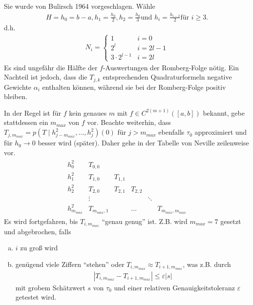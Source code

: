 \documentclass[ngerman,fontsize=11pt, paper=a4, parskip=half, titlepage=true, toc=bib]{scrbook}
\begin{document}
Sie wurde von Bulirsch 1964 vorgeschlagen.
Wähle 
\begin{gather}
  H=h_0=b-a, h_1=\frac{h_0}{2},h_2=\frac{h_0}{3}
  \text{und }  h_i=\frac{h_{i-2}}{2} \text{für } i\geq 3.
  \label{VII.3.9}
\end{gather}
d.h. 
\begin{gather*}
  N_i = \begin{cases}1&i=0\\2^l&i=2l-1\\3\cdot2^{l-1}&i=2l\end{cases}
\end{gather*}
Es sind ungefähr die Hälfte 
der $f$-Auswertungen der Romberg-Folge nötig.
Ein Nachteil ist jedoch,
dass die $T_{j,k}$ entsprechenden Quadraturformeln
negative Gewichte $\alpha_i$ enthalten können,
während sie bei der Romberg-Folge positiv bleiben.


In der Regel ist für $f$ kein genaues $m$ mit $f\in C^{2(m+1)}([a,b])$
bekannt,
gebe stattdessen ein $m_{max}$ von $f$ vor.
Beachte weiterhin, dass 
$T_{j,m_{max}}=p(T\mid h_{j-m_{max}}^2,\ldots,h_j^2)(0)$
für $j>m_{max}$ ebenfalls $\tau_0$ approximiert
und für $h_0\longrightarrow 0$ besser wird (später).
Daher gehe in der Tabelle von Neville zeilenweise vor.
\begin{align*}
  \begin{array}{lccccc}
    h_0^2 & T_{0,0}\\
    h_1^2 & T_{1,0} & T_{1,1}\\
    h_2^2 & T_{2,0} & T_{2,1} & T_{2,2} \\
          & \vdots&&&\ddots\\
    h_{m_{max}}^2 & T_{m_{max},1} &&\ldots && T_{m_{max},m_{max}}
  \end{array}
\end{align*}
Es wird fortgefahren, bis $T_{i,m_{max}}$ \enquote{genau genug} ist.
Z.B. wird $m_{max}=7$ gesetzt und abgebrochen, falls
\begin{enumerate}[a)]
\item $i$ zu groß wird
\item genügend viele Ziffern \enquote{stehen}
  oder $T_{i,m_{max}}\approx T_{i+1,m_{max}}$,
  was z.B. durch 
  \begin{gather}
    \left| T_{i,m_{max}}-T_{i+1,m_{max}}\right|\leq \varepsilon|s|
    \label{VII.3.20}
  \end{gather}
  mit grobem Schätzwert $s$ von $\tau_0$ und einer relativen
  Genauigkeitstoleranz $\varepsilon$ getestet wird.
\end{enumerate}
\end{document}

